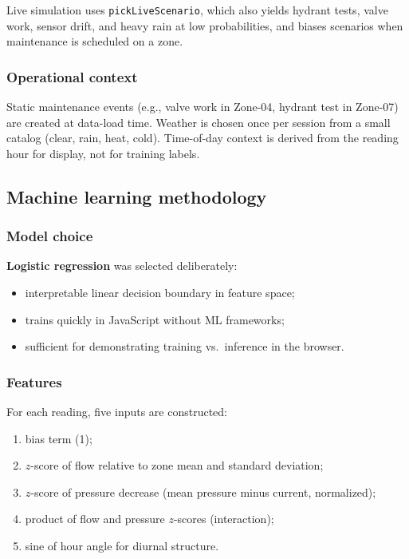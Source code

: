 \documentclass[12pt,a4paper]{article}
\begin{document}
Live simulation uses \texttt{pickLiveScenario}, which also yields hydrant tests, valve work, sensor drift, and heavy rain at low probabilities, and biases scenarios when maintenance is scheduled on a zone.

\subsubsection{Operational context}

Static maintenance events (e.g., valve work in Zone-04, hydrant test in Zone-07) are created at data-load time. Weather is chosen once per session from a small catalog (clear, rain, heat, cold). Time-of-day context is derived from the reading hour for display, not for training labels.

\subsection{Machine learning methodology}

\subsubsection{Model choice}

\textbf{Logistic regression} was selected deliberately:
\begin{itemize}
    \item interpretable linear decision boundary in feature space;
    \item trains quickly in JavaScript without ML frameworks;
    \item sufficient for demonstrating training vs.\ inference in the browser.
\end{itemize}

\subsubsection{Features}

For each reading, five inputs are constructed:
\begin{enumerate}
    \item bias term (1);
    \item $z$-score of flow relative to zone mean and standard deviation;
    \item $z$-score of pressure decrease (mean pressure minus current, normalized);
    \item product of flow and pressure $z$-scores (interaction);
    \item sine of hour angle for diurnal structure.
\end{enumerate}
\end{document}
